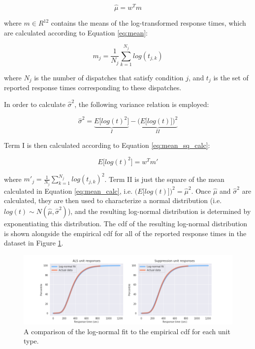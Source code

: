 \documentclass[article]{proc}
\begin{document}
\begin{equation}
\hat\mu = w^Tm
\label{eq:mean_calc}
\end{equation}


where $m \in R^{12}$ contains the means of the log-transformed response times, which are calculated according to Equation \ref{eq:mean}:

\begin{equation}
m_j = \frac{1}{N_j}\sum_{k=1}^{N_j}log(t_{j,k})
\label{eq:mean}
\end{equation}


where $N_j$ is the number of dispatches that satisfy condition $j$, and $t_j$ is the set of reported response times corresponding to these dispatches.


In order to calculate $\hat\sigma^2$, the following variance relation is employed:


\begin{equation}
\hat\sigma^2 = \underbrace{E\big[log(t)^2\big]}_{I} - \underbrace{\bigg(E\big[log(t)\big]\bigg)^2}_{II}
\label{eq:var}
\end{equation}

Term I is then calculated according to Equation \ref{eq:mean_sq_calc}:

\begin{equation}
E\big[log(t)^2\big] = w^Tm'
\label{eq:mean_sq_calc}
\end{equation}

where 
$m'_j = \frac{1}{N_j}\sum_{k=1}^{N_j}log(t_{j,k})^2$. Term II is just the square of the mean calculated in Equation \ref{eq:mean_calc}, i.e. $\big(E\big[log(t)\big]\big)^2 = \hat\mu^2$. Once $\hat\mu$ and $\hat\sigma^2$ are calculated, they are then used to characterize a normal distribution (i.e. $ log(t) \sim N(\hat\mu, \hat\sigma^2)$), and the resulting log-normal distribution is determined by exponentiating this distribution. The cdf of the resulting log-normal distribution is shown alongside the empirical cdf for all of the reported response times in the dataset in Figure \ref{fig:lognorm}.


\begin{figure}[!htb]
  \centering
  \includegraphics[width=16cm,keepaspectratio]{Figures/lognorm.png}
  \caption{A comparison of the log-normal fit to the empirical cdf for each unit type.}
  \label{fig:lognorm}
\end{figure}
\end{document}

